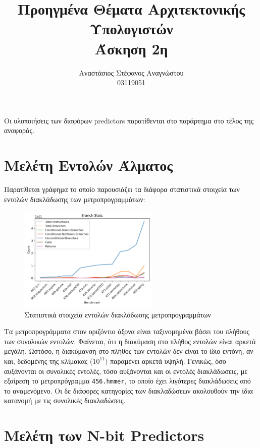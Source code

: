 \documentclass{article}
\title{Προηγμένα Θέματα Αρχιτεκτονικής Υπολογιστών\\
\large Άσκηση 2η}
\author{Αναστάσιος Στέφανος Αναγνώστου \\
\large 03119051}
\newcommand{\eng}[1]{\foreignlanguage{english}{#1}}
\begin{document}
\maketitle
\clearpage
\tableofcontents
\clearpage

Οι υλοποιήσεις των διαφόρων \eng{predictors} παρατίθενται στο παράρτημα στο τέλος της αναφοράς. 

\section{Μελέτη Εντολών Άλματος}

Παρατίθεται γράφημα το οποίο παρουσιάζει τα διάφορα στατιστικά στοιχεία των εντολών διακλάδωσης των μετροπρογραμμάτων:

\begin{figure}[h]
    \centering
    \includegraphics[width=0.6\textwidth]{./outputs/branch_stats.png} 
    \caption{Στατιστικά στοιχεία εντολών διακλάδωσης μετροπρογραμμάτων}
    \label{fig:branch_stats}
\end{figure}
\FloatBarrier

Τα μετροπρογράμματα στον οριζόντιο άξονα είναι ταξινομημένα βάσει του πλήθους των συνολικών εντολών. Φαίνεται, ότι η διακύμαση στο πλήθος εντολών είναι αρκετά μεγάλη. Ωστόσο, η διακύμανση στο πλήθος των εντολών δεν είναι το ίδιο εντόνη, αν και, δεδομένης της κλίμακας ($10^{11})$ παραμένει αρκετά υψηλή. Γενικώς, όσο αυξάνονται οι συνολικές εντολές, τόσο αυξάνονται και οι εντολές διακλάδωσεις, με εξαίρεση το μετροπρόγραμμα \eng{\texttt{456.hmmer}}, το οποίο έχει λιγότερες διακλάδωσεις από το αναμενόμενο. Οι δε διάφορες κατηγορίες των διακλαδώσεων ακολουθούν την ίδια κατανομή με τις συνολικές διακλαδώσεις.

\clearpage
\section{Μελέτη των \eng{N-bit Predictors}}
\end{document}
